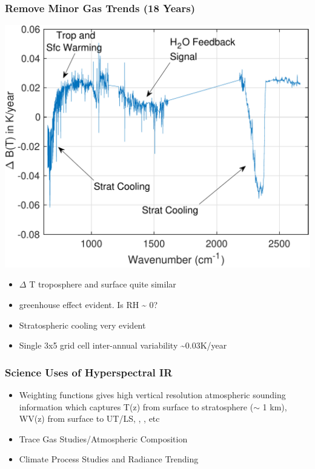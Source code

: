 \documentclass[10pt,t]{beamer}
\begin{document}
\begin{frame}
\frametitle{Remove Minor Gas Trends (18 Years)}
\vspace{-0.1in}

\begin{center}
\includegraphics[width=0.7\linewidth]{./Figslls/global18year_forcing_removed.pdf}
\end{center}

\vspace{-0.15in}
\begin{small}
\begin{itemize}
\item \(\Delta\) T troposphere and surface quite similar
\item \water greenhouse effect evident.  Is RH \textasciitilde{} 0?
\item Stratospheric cooling very evident
\item Single 3x5 grid cell inter-annual variability \textasciitilde{}0.03K/year
\end{itemize}
\end{small}
\end{frame}
\begin{frame}
\frametitle{Science Uses of Hyperspectral IR}  
\begin{itemize}
  \item Weighting functions gives high vertical resolution atmospheric sounding information which captures 
         T(z) from surface to stratosphere ($\sim$ 1 km), WV(z) from surface to UT/LS, \ozone, \cd, \methane etc
  \item Trace Gas Studies/Atmospheric Composition
  \item Climate Process Studies and Radiance Trending
  \end{itemize}
\end{frame}
\end{document}
